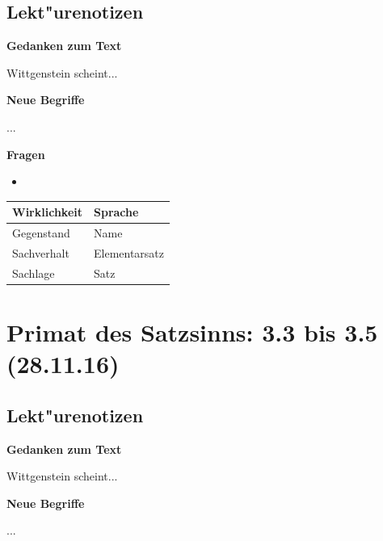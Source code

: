 \documentclass[]{scrartcl}
\begin{document}
\subsection{Lekt"urenotizen}
\textbf{Gedanken zum Text}

Wittgenstein scheint...

\vspace{10pt}
\textbf{Neue Begriffe}

\begin{description}[leftmargin=!,labelwidth=\widthof{\bfseries Sachverhalt}]
  \item[Bild] ...
  \item[Tatsache] 
\end{description}

\textbf{Fragen}

\begin{itemize}
  \item 
\end{itemize}

\begin{center}
    \begin{tabular}{  l | l }
    \textbf{Wirklichkeit} & \textbf{Sprache}\\ \hline
    Gegenstand & Name \\ 
    Sachverhalt & Elementarsatz \\
    Sachlage & Satz \\
    \end{tabular}
\end{center}


\section{Primat des Satzsinns: 3.3 bis 3.5\\(28.11.16)}


\subsection{Lekt"urenotizen}
\textbf{Gedanken zum Text}

Wittgenstein scheint...

\vspace{10pt}
\textbf{Neue Begriffe}

\begin{description}[leftmargin=!,labelwidth=\widthof{\bfseries Sachverhalt}]
  \item[Bild] ...
  \item[Tatsache] 
\end{description}
\end{document}
